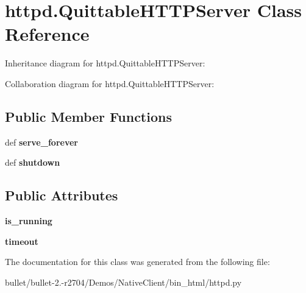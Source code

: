 \hypertarget{classhttpd_1_1_quittable_h_t_t_p_server}{\section{httpd.\+Quittable\+H\+T\+T\+P\+Server Class Reference}
\label{classhttpd_1_1_quittable_h_t_t_p_server}
}


Inheritance diagram for httpd.\+Quittable\+H\+T\+T\+P\+Server\+:


Collaboration diagram for httpd.\+Quittable\+H\+T\+T\+P\+Server\+:
\subsection*{Public Member Functions}
\begin{DoxyCompactItemize}
\item 
\hypertarget{classhttpd_1_1_quittable_h_t_t_p_server_ad2aa195f477a6972ba22d407ec42aafd}{def {\bfseries serve\+\_\+forever}}\label{classhttpd_1_1_quittable_h_t_t_p_server_ad2aa195f477a6972ba22d407ec42aafd}

\item 
\hypertarget{classhttpd_1_1_quittable_h_t_t_p_server_a66b118c6d23aa098c1d18e69d9ba538d}{def {\bfseries shutdown}}\label{classhttpd_1_1_quittable_h_t_t_p_server_a66b118c6d23aa098c1d18e69d9ba538d}

\end{DoxyCompactItemize}
\subsection*{Public Attributes}
\begin{DoxyCompactItemize}
\item 
\hypertarget{classhttpd_1_1_quittable_h_t_t_p_server_a6a4b589bcbc135ad92ea4c7098f3097c}{{\bfseries is\+\_\+running}}\label{classhttpd_1_1_quittable_h_t_t_p_server_a6a4b589bcbc135ad92ea4c7098f3097c}

\item 
\hypertarget{classhttpd_1_1_quittable_h_t_t_p_server_a3b6d037356faf5eeae60625c13c83e8f}{{\bfseries timeout}}\label{classhttpd_1_1_quittable_h_t_t_p_server_a3b6d037356faf5eeae60625c13c83e8f}

\end{DoxyCompactItemize}


The documentation for this class was generated from the following file\+:\begin{DoxyCompactItemize}
\item 
bullet/bullet-\/2.-\/r2704/\+Demos/\+Native\+Client/bin\+\_\+html/httpd.\+py\end{DoxyCompactItemize}
